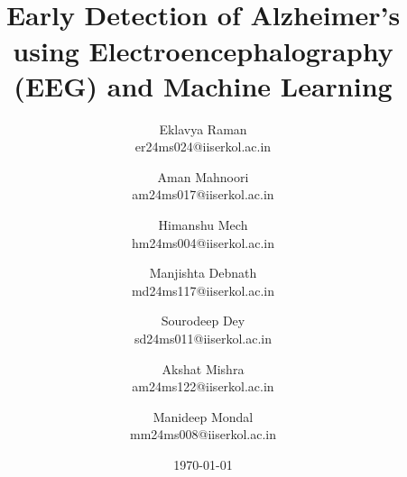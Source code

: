 \documentclass[openany]{book}
\begin{document}
\title{\Large{} \\ \vspace{5pt}
\large{Early Detection of Alzheimer's using Electroencephalography (EEG) and Machine Learning}}
\author{Eklavya Raman \\ \vspace{5pt} er24ms024@iiserkol.ac.in \\ 
\and Aman Mahnoori \\ \vspace{5pt} am24ms017@iiserkol.ac.in \\ 
\and Himanshu Mech \\ \vspace{5pt} hm24ms004@iiserkol.ac.in \\
\and Manjishta Debnath \\ \vspace{5pt} md24ms117@iiserkol.ac.in \\
\and Sourodeep Dey \\ \vspace{5pt} sd24ms011@iiserkol.ac.in \\
\and Akshat Mishra \\ \vspace{5pt} am24ms122@iiserkol.ac.in \\
\and Manideep Mondal \\ \vspace{5pt} mm24ms008@iiserkol.ac.in}
\date{\today}
\maketitle
\tableofcontents
\end{document}

